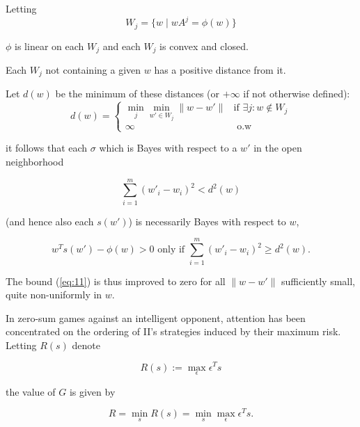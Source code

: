 \documentclass[11pt]{article}
\numberwithin{equation}{section}
\theoremstyle{boldStyle}
\begin{document}
\bigbreak

Letting 
\begin{equation*}
    W_j = \{w \mid wA^j = \phi(w) \} 
\end{equation*}

\(\phi\) is linear on each \( W_j \) and each \( W_j \) is convex and closed. 


Each \( W_j \) not containing a given \( w \) has a positive distance from it. 

Let \( d(w) \) be the minimum of these distances (or \( + \infty \) if not otherwise defined):
\begin{equation*}
    d(w) = 
    \begin{cases}
        \min_{j} \min_{w' \in W_j} \|w - w'\| & \text{if } \exists j : w \notin W_j \\
        \infty & \text{ o.w }
    \end{cases}
\end{equation*}

\begin{bluebox}
it follows that each \(\sigma\) which is Bayes with respect to a \( w' \) in the open neighborhood

\begin{equation*}
\sum_{i=1}^{m} (w'_i - w_i)^2 < d^2(w)
\end{equation*}

(and hence also each  $s(w')$) is necessarily Bayes with respect to \( w \),

\begin{equation} \label{eq:2.15}
w^T s(w') - \phi(w) > 0 \text{ only if } \sum_{i=1}^{m} (w'_i - w_i)^2 \geq d^2(w).
\end{equation}
\end{bluebox}


The bound (\ref{eq:11}) is thus improved to zero for all \(\|w - w'\|\) sufficiently small, quite non-uniformly in \( w \).

\bigbreak

In zero-sum games against an intelligent opponent, attention has been concentrated on the ordering of II's 
strategies induced by their maximum risk. Letting \( R(s) \) denote

\begin{equation*}
    R(s) := \max_{\epsilon} \epsilon^T s
\end{equation*}

the value of \( G \) is given by

\begin{equation*}
    R = \min_{s} R(s) = \min_{s} \max_{\epsilon} \epsilon^T s.
\end{equation*}
\end{document}
